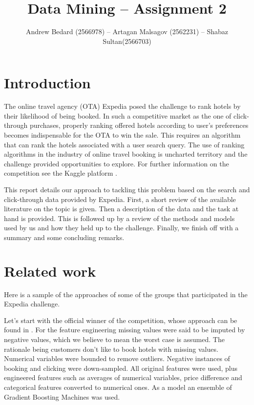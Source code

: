 \documentclass{llncs}
\title{Data Mining -- Assignment 2}
\author{Andrew Bedard (2566978) -- Artagan Malsagov (2562231)  -- Shabaz Sultan(2566703)}
\institute{}
\begin{document}
\maketitle
\section{Introduction}
The online travel agency (OTA) Expedia posed the challenge to rank hotels by their likelihood of being booked. In such a competitive market as the one of click-through purchases, properly ranking offered hotels according to user's preferences becomes indispensable for the OTA to win the sale. This requires an algorithm that can rank the hotels associated with a user search query. The use of ranking algorithms in the industry of online travel booking is uncharted territory and the challenge provided opportunities to explore. For further information on the competition see the Kaggle platform \cite{WinNT}.

This report details our approach to tackling this problem based on the search and click-through data provided by Expedia. First, a short review of the available literature on the topic is given. Then a description of the data and the task at hand is provided. This is followed up by a review of the methods and models used by us and how they held up to the challenge. Finally, we finish off with a summary and some concluding remarks.  

\section{Related work}
Here is a sample of the approaches of some of the groups that participated in the Expedia challenge. 

Let's start with the official winner of the competition, whose approach can be found in \cite{WinNT2}. For the feature engineering missing values were said to be imputed by negative values, which we believe to mean the worst case is assumed. The rationale being customers don't like to book hotels with missing values. Numerical variables were bounded to remove outliers. Negative instances of booking and clicking were down-sampled. All original features were used, plus engineered features such as averages of numerical variables, price difference and categorical features converted to numerical ones. As a model an ensemble of Gradient Boosting Machines was used. 
\end{document}
